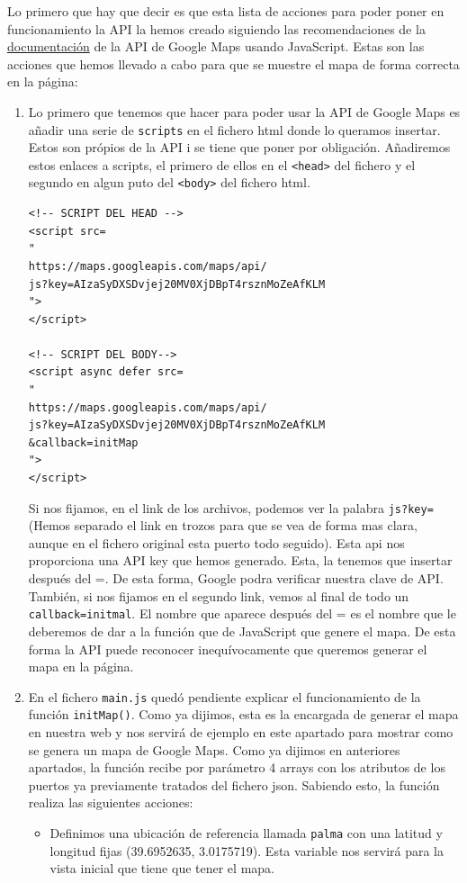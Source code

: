\documentclass{article}
\begin{document}
\noindent Lo primero que hay que decir es que esta lista de acciones para poder poner en funcionamiento la API la hemos creado siguiendo las recomendaciones de la \href{https://developers.google.com/maps/documentation/javascript?hl=es-419}{documentación} de la API de Google Maps usando JavaScript. Estas son las acciones que hemos llevado a cabo para que se muestre el mapa de forma correcta en la página:
\begin{enumerate}
    \item Lo primero que tenemos que hacer para poder usar la API de Google Maps es añadir una serie de \texttt{scripts} en el fichero html donde lo queramos insertar. Estos son própios de la API i se tiene que poner por obligación. Añadiremos estos enlaces a scripts, el primero de ellos en el \texttt{<head>} del fichero y el segundo en algun puto del \texttt{<body>} del fichero html.
    \begin{verbatim}
<!-- SCRIPT DEL HEAD -->
<script src=
"
https://maps.googleapis.com/maps/api/
js?key=AIzaSyDXSDvjej20MV0XjDBpT4rsznMoZeAfKLM
">
</script>

<!-- SCRIPT DEL BODY-->
<script async defer src=
"
https://maps.googleapis.com/maps/api/
js?key=AIzaSyDXSDvjej20MV0XjDBpT4rsznMoZeAfKLM
&callback=initMap
">
</script>
    \end{verbatim}
    Si nos fijamos, en el link de los archivos, podemos ver la palabra \texttt{js?key=} (Hemos separado el link en trozos para que se vea de forma mas clara, aunque en el fichero original esta puerto todo seguido). Esta api nos proporciona una API key que hemos generado. Esta, la tenemos que insertar después del =. De esta forma, Google podra verificar nuestra clave de API. También, si nos fijamos en el segundo link, vemos al final de todo un \texttt{callback=initmal}. El nombre que aparece después del = es el nombre que le deberemos de dar a la función que de JavaScript que genere el mapa. De esta forma la API puede reconocer inequívocamente que queremos generar el mapa en la página.
    
    \item  En el fichero \texttt{main.js} quedó pendiente explicar el funcionamiento de la función \texttt{initMap()}. Como ya dijimos, esta es la encargada de generar el mapa en nuestra web y nos servirá de ejemplo en este apartado para mostrar como se genera un mapa de Google Maps. Como ya dijimos en anteriores apartados, la función recibe por parámetro 4 arrays con los atributos de los puertos ya previamente tratados del fichero json. Sabiendo esto, la función realiza las siguientes acciones:
    \begin{itemize}
        \item Definimos una ubicación de referencia llamada \texttt{palma} con una latitud y longitud fijas (39.6952635, 3.0175719). Esta variable nos servirá para la vista inicial que tiene que tener el mapa.
        

\end{itemize}
\end{enumerate}
\end{document}
